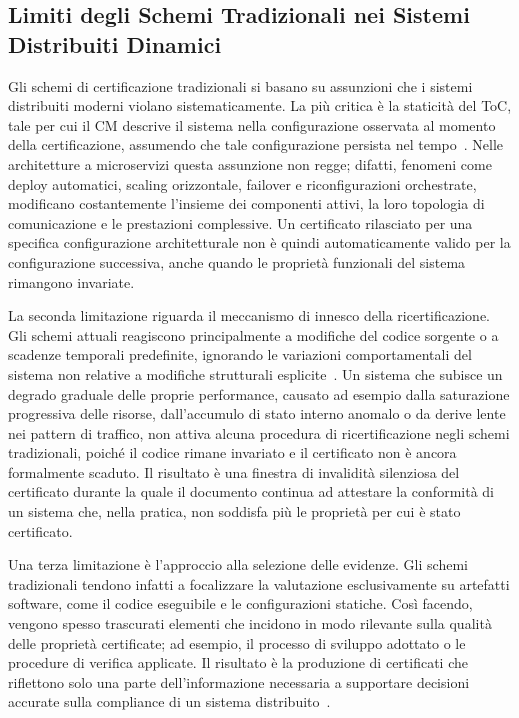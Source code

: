 \subsection{Limiti degli Schemi Tradizionali nei Sistemi Distribuiti Dinamici}
\label{subsec:limiti_tradizionali}

Gli schemi di certificazione tradizionali si basano su assunzioni che i sistemi distribuiti 
moderni violano sistematicamente. La più critica è la staticità del \gls{ToC}, tale per cui il \gls{CM} 
descrive il sistema nella configurazione osservata al momento della certificazione, assumendo 
che tale configurazione persista nel tempo~\cite{ardagna2023manifesto}. Nelle architetture a microservizi questa 
assunzione non regge; difatti, fenomeni come deploy automatici, scaling orizzontale, 
failover e riconfigurazioni orchestrate, modificano costantemente l'insieme dei componenti attivi, 
la loro topologia di comunicazione e le prestazioni complessive. Un certificato rilasciato per 
una specifica configurazione architetturale non è quindi automaticamente valido per la 
configurazione successiva, anche quando le proprietà funzionali del sistema rimangono invariate. 

La seconda limitazione riguarda il meccanismo di innesco della ricertificazione. Gli schemi
attuali reagiscono principalmente a modifiche del codice sorgente o a scadenze temporali
predefinite, ignorando le variazioni comportamentali del sistema non relative a modifiche
strutturali esplicite~\cite{anisetti2023continuous}. Un sistema che subisce un degrado graduale
delle proprie performance, causato ad esempio dalla saturazione progressiva delle risorse,
dall'accumulo di stato interno anomalo o da derive lente nei pattern di traffico, non attiva
alcuna procedura di ricertificazione negli schemi tradizionali, poiché il codice rimane
invariato e il certificato non è ancora formalmente scaduto. Il risultato è una finestra di
invalidità silenziosa del certificato durante la quale il documento continua ad attestare la
conformità di un sistema che, nella pratica, non soddisfa più le proprietà per cui è stato
certificato.

Una terza limitazione è l'approccio alla selezione delle evidenze. Gli schemi tradizionali 
tendono infatti a focalizzare la valutazione esclusivamente su artefatti software, 
come il codice eseguibile e le configurazioni statiche. Così facendo, vengono spesso trascurati 
elementi che incidono in modo rilevante sulla qualità delle proprietà certificate; 
ad esempio, il processo di sviluppo adottato o le procedure di verifica applicate. 
Il risultato è la produzione di certificati che riflettono solo una parte dell'informazione 
necessaria a supportare decisioni accurate sulla compliance di un sistema distribuito~\cite{anisetti2023multidim}.

